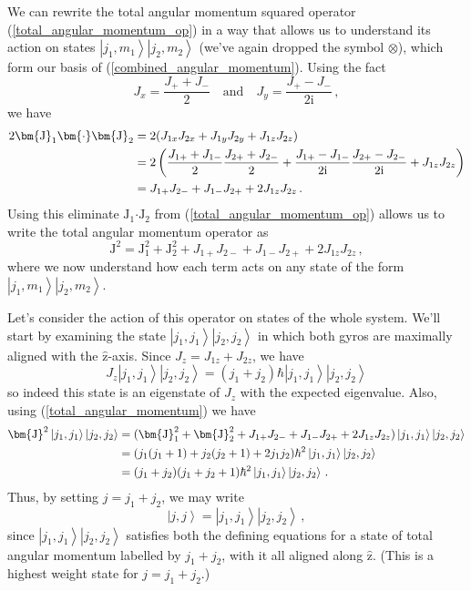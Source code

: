 \documentclass{article}
\theoremstyle{plain}\theoremheaderfont{\normalfont\itshape}\theorembodyfont{\rmfamily}\theoremseparator{.}\newtheorem*{rem}{Remark}\newtheorem*{ex}{Example}\newtheorem*{proof}{Proof}\newtheorem*{altp}{Alternative proof}
\theoremstyle{plain}\theoremheaderfont{\normalfont\bfseries}\theorembodyfont{\rmfamily}\theoremseparator{.}\newtheorem{thm}{Theorem}[section]\newtheorem{lem}[thm]{Lemma}\newtheorem{prop}[thm]{Proposition}\newtheorem*{cor}{Corollary}\newtheorem{defn}[thm]{Definition}\newtheorem{clm}[thm]{Claim}\newtheorem{clminproof}{Claim}
\theoremstyle{break}\theoremheaderfont{\normalfont\itshape}\theorembodyfont{\rmfamily}\theoremseparator{.\medskip}\newtheorem*{proofskip}{Proof}\newtheorem*{exs}{Examples}\newtheorem*{rems}{Remarks}
\theoremstyle{break}\theoremheaderfont{\normalfont\bfseries}\theorembodyfont{\rmfamily}\theoremseparator{.\medskip}\newtheorem{lemskip}[thm]{Lemma}\newtheorem{defnskip}[thm]{Definition}\newtheorem{propskip}[thm]{Proposition}\newtheorem{thmskip}[thm]{Theorem}
\numberwithin{equation}{section}
\newcommand{\ii}{\mathrm{i}}
\newcommand{\ket}[1]{\left| #1 \right\rangle}
\newcommand{\vb}[1]{\bm{\mathrm{#1}}}
\newcommand{\vu}[1]{\hat{\bm{\mathrm{#1}}}}
\newcommand{\vdot}{\bm{\cdot}}
\begin{document}
    We can rewrite the total angular momentum squared operator (\ref{total_angular_momentum_op}) in a way that allows us to understand its action on states \(\ket{j_1,m_1}\ket{j_2,m_2}\) (we've again dropped the symbol \(\otimes\)), which form our basis of (\ref{combined_angular_momentum}). Using the fact
    \begin{equation}
        J_x=\frac{J_+ + J_-}{2}\quad\text{and}\quad J_y=\frac{J_+ - J_-}{2\ii}\,,
    \end{equation}
    we have
    \begin{align}
        2\vb{J}_1\vdot\vb{J}_2&=2(J_{1x}J_{2x}+J_{1y}J_{2y}+J_{1z}J_{2z})\notag\\
        &=2\left(\frac{J_{1+}+J_{1-}}{2}\frac{J_{2+}+J_{2-}}{2}+\frac{J_{1+}-J_{1-}}{2\ii}\frac{J_{2+}-J_{2-}}{2\ii}+J_{1z}J_{2z}\right)\notag\\
        &=J_{1+}J_{2-}+J_{1-}J_{2+}+2J_{1z}J_{2z}\,.\label{total_angular_momentum}
    \end{align}
    Using this eliminate \(\vb{J}_1\vdot\vb{J}_2\) from (\ref{total_angular_momentum_op}) allows us to write the total angular momentum operator as
    \begin{equation}
        \vb{J}^2=\vb{J}_1^2+\vb{J}_2^2+J_{1+}J_{2-}+J_{1-}J_{2+}+2J_{1z}J_{2z}\,,
    \end{equation}
    where we now understand how each term acts on any state of the form \(\ket{j_1,m_1}\ket{j_2,m_2}\).

    Let's consider the action of this operator on states of the whole system. We'll start by examining the state \(\ket{j_1,j_1}\ket{j_2,j_2}\) in which both gyros are maximally aligned with the \(\vu{z}\)-axis. Since \(J_z=J_{1z}+J_{2z}\), we have
    \begin{equation}
        J_z\ket{j_1,j_1}\ket{j_2,j_2}=(j_1+j_2)\hbar\ket{j_1,j_1}\ket{j_2,j_2}
    \end{equation}
    so indeed this state is an eigenstate of \(J_z\) with the expected eigenvalue. Also, using (\ref{total_angular_momentum}) we have
    \begin{align}
        \vb{J}^2\ket{j_1,j_1}\ket{j_2,j_2}&=(\vb{J}_1^2+\vb{J}_2^2+J_{1+}J_{2-}+J_{1-}J_{2+}+2J_{1z}J_{2z})\ket{j_1,j_1}\ket{j_2,j_2}\notag\\
        &=(j_1(j_1+1)+j_2(j_2+1)+2j_1j_2)\hbar^2\ket{j_1,j_1}\ket{j_2,j_2}\notag\\
        &=(j_1+j_2)(j_1+j_2+1)\hbar^2\ket{j_1,j_1}\ket{j_2,j_2}\,.
    \end{align}
    Thus, by setting \(j=j_1+j_2\), we may write
    \begin{equation}
        \ket{j,j}=\ket{j_1,j_1}\ket{j_2,j_2}\,,
    \end{equation}
    since \(\ket{j_1,j_1}\ket{j_2,j_2}\) satisfies both the defining equations for a state of total angular momentum labelled by \(j_1+j_2\), with it all aligned along \(\vu{z}\). (This is a highest weight state for \(j=j_1+j_2\).)
\end{document}
